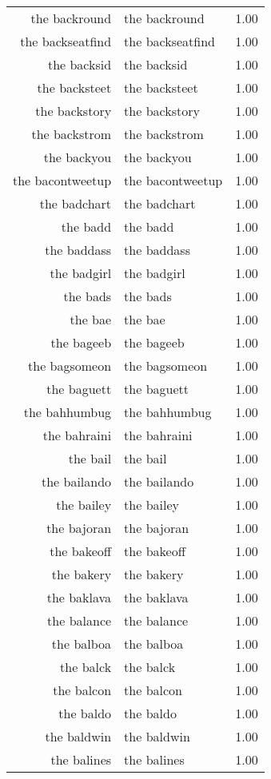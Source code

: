 \begin{table}[ht]
\begin{tabular}{rlr}
  the backround & the backround & 1.00 \\ 
  the backseatfind & the backseatfind & 1.00 \\ 
  the backsid & the backsid & 1.00 \\ 
  the backsteet & the backsteet & 1.00 \\ 
  the backstory & the backstory & 1.00 \\ 
  the backstrom & the backstrom & 1.00 \\ 
  the backyou & the backyou & 1.00 \\ 
  the bacontweetup & the bacontweetup & 1.00 \\ 
  the badchart & the badchart & 1.00 \\ 
  the badd & the badd & 1.00 \\ 
  the baddass & the baddass & 1.00 \\ 
  the badgirl & the badgirl & 1.00 \\ 
  the bads & the bads & 1.00 \\ 
  the bae & the bae & 1.00 \\ 
  the bageeb & the bageeb & 1.00 \\ 
  the bagsomeon & the bagsomeon & 1.00 \\ 
  the baguett & the baguett & 1.00 \\ 
  the bahhumbug & the bahhumbug & 1.00 \\ 
  the bahraini & the bahraini & 1.00 \\ 
  the bail & the bail & 1.00 \\ 
  the bailando & the bailando & 1.00 \\ 
  the bailey & the bailey & 1.00 \\ 
  the bajoran & the bajoran & 1.00 \\ 
  the bakeoff & the bakeoff & 1.00 \\ 
  the bakery & the bakery & 1.00 \\ 
  the baklava & the baklava & 1.00 \\ 
  the balance & the balance & 1.00 \\ 
  the balboa & the balboa & 1.00 \\ 
  the balck & the balck & 1.00 \\ 
  the balcon & the balcon & 1.00 \\ 
  the baldo & the baldo & 1.00 \\ 
  the baldwin & the baldwin & 1.00 \\ 
  the balines & the balines & 1.00 \\ 

\end{tabular}
\end{table}

